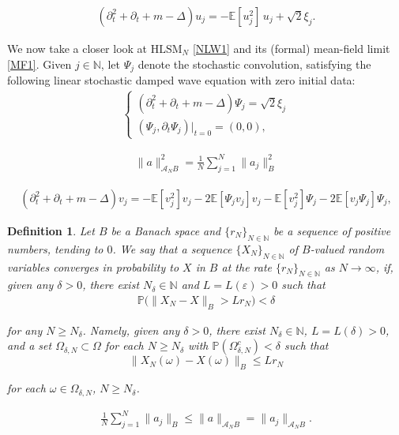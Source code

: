 \documentclass[10pt,a4paper]{amsart}
\newtheorem{definition}{Definition}
\newcommand{\A}{\mathcal{A}}
\newcommand{\Dl}{\Delta}
\newcommand{\E}{\mathbb{E}}
\newcommand{\HLS}{$\text{HLSM}_N$ }
\newcommand{\N}{\mathbb{N}}
\renewcommand{\O}{\Omega}
\newcommand{\PP}{\mathbb{P}}
\newcommand{\dl}{\delta}
\newcommand{\dt}{\partial_t}
\newcommand{\eps}{\varepsilon}
\newcommand{\noi}{\noindent}
\renewcommand{\o}{\omega}
\begin{document}
\begin{align}
    (\dt^2 + \dt + m - \Dl) u_j = - \E [ u_j^2 ] \,u_j + \sqrt{2} \xi_j.
\label{MF1}
\end{align}

We now take a closer look at \HLS  \eqref{NLW1} and its (formal) mean-field limit \eqref{MF1}. Given  $j \in \N$, let $\Psi_j$ 
denote the stochastic convolution, satisfying  the following linear stochastic damped wave equation with zero initial data:
\begin{align}
\begin{cases}
(\dt^2 + \dt + m - \Dl) \Psi_j = \sqrt{2} \xi_j\\
(\Psi_j, \dt \Psi_j) |_{t = 0} = (0, 0), 
\end{cases}    
\label{psi1}
\end{align}

\begin{align}
    \|  a \|_{\A_N B}^2 =  \frac{1}{N} \sum_{j = 1}^N \| a_j \|_B^2
\label{AN0} 
\end{align} 

\begin{align}
(\dt^2 + \dt + m - \Dl) v_j = 
- \E [ v_j^2 ] v_j
- 2 \E [ \Psi_j v_j ] v_j 
- \E [ v_j^2 ] \Psi_j 
- 2 \E [ v_j \Psi_j  ] \Psi_j , 
\label{NLW5}
\end{align}

\begin{definition}\label{DEF:conv1}
\rm 
Let $B$ be a Banach space
and $\{r_N\}_{N \in \N}$
be a sequence of positive numbers, 
tending to $0$.
We say that a sequence $\{ X_N\}_{N \in \N}$ of 
$B$-valued random variables converges
in probability to $X$ in $B$ at  the rate $\{r_N\}_{N \in \N}$
as $N \to \infty$,  
if, given any $\dl > 0$, there exist $N_\dl \in \N$ and  $L = L(\eps) > 0$
such that 
\begin{align}
\PP\Big(\| X_N - X\|_B > L r_N \Big) < \dl
\label{PR1}
\end{align}

\noi
for any $N \ge  N_\dl$.
Namely, given any $\dl > 0$, 
there exist 
$N_\dl \in \N$,
$L = L(\dl) > 0$, and a set $\O_{\dl, N} \subset \O$
for each $N \ge N_\dl$
with $\PP(\O_{\dl, N}^c) < \dl$
such that 
\[ \| X_N(\o) - X(\o) \|_B \le L r_N \]

\noi
for each $\o \in \O_{\dl, N}$, $N \ge N_\dl$.

\end{definition}

\begin{align}
 \frac{1}{N} \sum_{j = 1}^N \| a_j \|_B
\le     \|  a \|_{\A_N B} = \|a_j \|_{\A_{N}B}. 
\label{AN1a}
\end{align}
\end{document}
